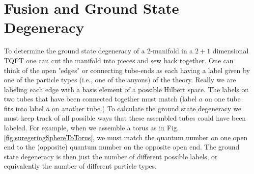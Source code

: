 \documentclass{book}
\begin{document}
\section{Fusion and Ground State Degeneracy}
To determine the ground state degeneracy of a 2-manifold in a $2+1$ dimensional TQFT one can cut the manifold into pieces and sew back together. One can think of the open "edges" or connecting tube-ends as each having a label given by one of the particle types (i.e., one of the anyons) of the theory. Really we are labeling each edge with a basis element of a possible Hilbert space. The labels on two tubes that have been connected together must match (label $a$ on one tube fits into label $\bar{a}$ on another tube.) To calculate the ground state degeneracy we must keep track of all possible ways that these assembled tubes could have been labeled. For example, when we assemble a torus as in Fig.\ref{fig:suregeringSphereToTorus}, we must match the quantum number on one open end to the (opposite) quantum number on the opposite open end. The ground state degeneracy is then just the number of different possible labels, or equivalently the number of different particle types.
\end{document}
